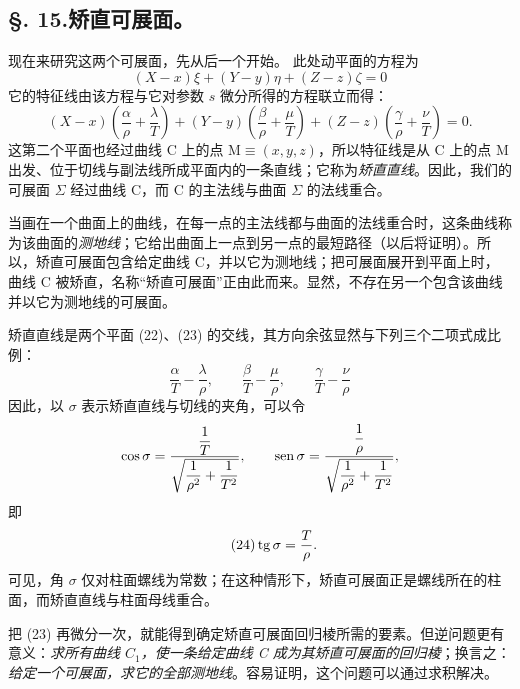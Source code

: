 \subsection*{\S. 15.\quad 矫直可展面。}
现在来研究这两个可展面，先从后一个开始。
此处动平面的方程为
\begin{equation}\tag{22}
(X-x)\xi+(Y-y)\eta+(Z-z)\zeta=0
\end{equation}
它的特征线由该方程与它对参数 \(s\) 微分所得的方程联立而得：
\begin{equation}\tag{23}
(X-x)\left(\frac{\alpha}{\rho}+\frac{\lambda}{T}\right)+
(Y-y)\left(\frac{\beta}{\rho}+\frac{\mu}{T}\right)+
(Z-z)\left(\frac{\gamma}{\rho}+\frac{\nu}{T}\right)=0.
\end{equation}
这第二个平面也经过曲线 C 上的点 \(\mathrm{M}\equiv(x,y,z)\)，所以特征线是从 C 上的点 M 出发、位于切线与副法线所成平面内的一条直线；它称为\emph{矫直直线}。因此，我们的可展面 \(\Sigma\) 经过曲线 C，而 C 的主法线与曲面 \(\Sigma\) 的法线重合。

当画在一个曲面上的曲线，在每一点的主法线都与曲面的法线重合时，这条曲线称为该曲面的\emph{测地线}；它给出曲面上一点到另一点的最短路径（以后将证明）。所以，矫直可展面包含给定曲线 C，并以它为测地线；把可展面展开到平面上时，曲线 C 被矫直，名称“矫直可展面”正由此而来。显然，不存在另一个包含该曲线并以它为测地线的可展面。

矫直直线是两个平面 (22)、(23) 的交线，其方向余弦显然与下列三个二项式成比例：
\[
\frac{\alpha}{T}-\frac{\lambda}{\rho},
\qquad
\frac{\beta}{T}-\frac{\mu}{\rho},
\qquad
\frac{\gamma}{T}-\frac{\nu}{\rho}
\]
因此，以 \(\sigma\) 表示矫直直线与切线的夹角，可以令
\[
\cos\sigma=\frac{\dfrac{1}{T}}{\sqrt{\dfrac{1}{\rho^2}+\dfrac{1}{T^2}}},
\qquad
\operatorname{sen}\sigma=\frac{\dfrac{1}{\rho}}{\sqrt{\dfrac{1}{\rho^2}+\dfrac{1}{T^2}}},
\]
即
\begin{equation}\tag{24}
\operatorname{tg}\sigma=\frac{T}{\rho}.
\end{equation}
可见，角 \(\sigma\) 仅对柱面螺线为常数；在这种情形下，矫直可展面正是螺线所在的柱面，而矫直直线与柱面母线重合。

把 (23) 再微分一次，就能得到确定矫直可展面回归棱所需的要素。但逆问题更有意义：\emph{求所有曲线 \(C_1\)，使一条给定曲线 C 成为其矫直可展面的回归棱}；换言之：\emph{给定一个可展面，求它的全部测地线}。容易证明，这个问题可以通过求积解决。

